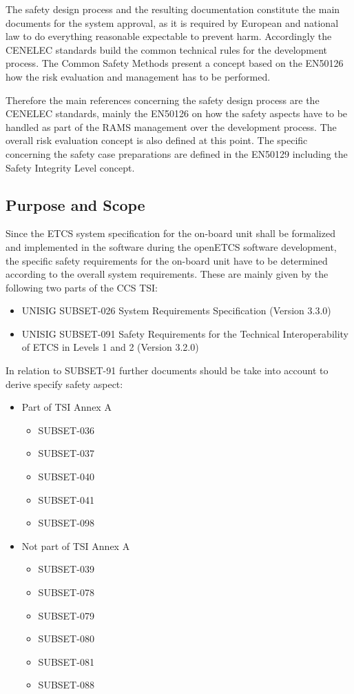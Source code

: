 \documentclass{template/openetcs_report}
\begin{document}
The safety design process and the resulting documentation constitute the main documents for the system approval, as it is required by European and national law to do everything reasonable expectable to prevent harm. Accordingly the CENELEC standards build the common technical rules for the development process. The Common Safety Methods present a concept based on the EN50126 how the risk evaluation and management has to be performed. 

Therefore the main references concerning the safety design process are the CENELEC standards, mainly the EN50126 on how the safety aspects have to be handled as part of the RAMS management over the development process. The overall risk evaluation concept is also defined at this point. The specific concerning the safety case preparations are defined in the EN50129 including the Safety Integrity Level concept. 

\subsection{Purpose and Scope}

 Since the ETCS system specification for the on-board unit shall be formalized and implemented in the software during the openETCS software development, the specific safety requirements for the on-board unit have to be determined according to the overall system requirements. These are mainly given by the following two parts of the CCS TSI:
 
 \begin{itemize}
 \item UNISIG SUBSET-026	System Requirements Specification 	(Version 3.3.0)
 \item UNISIG SUBSET-091 Safety Requirements for the Technical Interoperability of ETCS in Levels 1 and 2 	(Version 3.2.0)
 \end{itemize}
 
 In relation to SUBSET-91 further documents should be take into account to derive specify safety aspect:
 
 \begin{itemize}
 \item Part of TSI Annex A
 	\begin{itemize}
 	\item SUBSET-036
 	\item SUBSET-037
 	\item SUBSET-040
 	\item SUBSET-041
 	\item SUBSET-098
 	\end{itemize}
 	
 \item Not part of TSI Annex A
 	\begin{itemize}
 	\item SUBSET-039
 	\item SUBSET-078
 	\item SUBSET-079
 	\item SUBSET-080
 	\item SUBSET-081
 	\item SUBSET-088
 	\end{itemize}
 \end{itemize}
 
\end{document}
